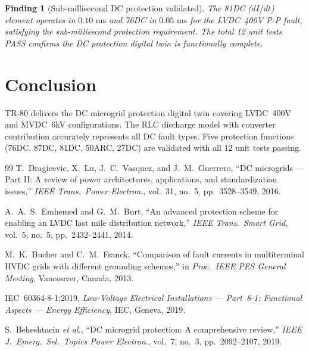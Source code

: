 \documentclass[11pt, a4paper]{article}
\newcommand{\ms}{\,\text{ms}}
\newtheorem{finding}{Finding}
\begin{document}
\begin{finding}[Sub-millisecond DC protection validated]
The 81DC ($dI/dt$) element operates in $0.10\,\ms$ and 76DC in $0.05\,\ms$
for the LVDC~400V P-P fault, satisfying the sub-millisecond protection
requirement. The total 12 unit tests PASS confirms the DC protection digital
twin is functionally complete.
\end{finding}

\section{Conclusion}
\label{sec:conclusion}

TR-80 delivers the DC microgrid protection digital twin covering LVDC~400V
and MVDC~6kV configurations. The RLC discharge model with converter contribution
accurately represents all DC fault types. Five protection functions (76DC, 87DC,
81DC, 50ARC, 27DC) are validated with all 12 unit tests passing.

\begin{thebibliography}{99}
T.~Dragicevic, X.~Lu, J.~C.~Vasquez, and J.~M.~Guerrero,
``DC microgrids --- Part II: A review of power architectures, applications,
and standardization issues,''
\emph{IEEE Trans.\ Power Electron.}, vol.~31, no.~5, pp.~3528--3549, 2016.

A.~A.~S.~Emhemed and G.~M.~Burt,
``An advanced protection scheme for enabling an LVDC last mile distribution
network,''
\emph{IEEE Trans.\ Smart Grid}, vol.~5, no.~5, pp.~2432--2441, 2014.

M.~K.~Bucher and C.~M.~Franck,
``Comparison of fault currents in multiterminal HVDC grids with different
grounding schemes,''
in \emph{Proc.\ IEEE PES General Meeting}, Vancouver, Canada, 2013.

IEC~60364-8-1:2019, \emph{Low-Voltage Electrical Installations ---
Part~8-1: Functional Aspects --- Energy Efficiency}, IEC, Geneva, 2019.

S.~Beheshtaein \emph{et al.},
``DC microgrid protection: A comprehensive review,''
\emph{IEEE J.\ Emerg.\ Sel.\ Topics Power Electron.}, vol.~7, no.~3,
pp.~2092--2107, 2019.
\end{thebibliography}
\end{document}
